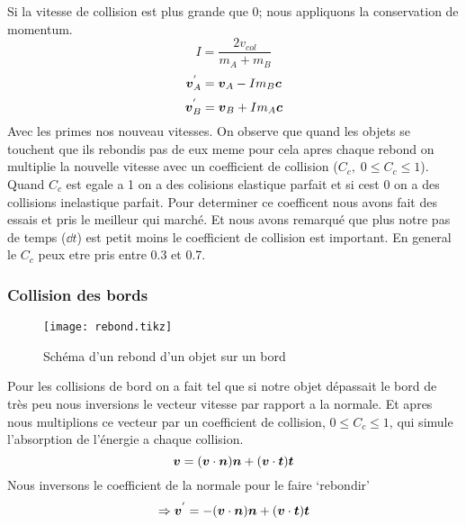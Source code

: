             Si la vitesse de collision est plus grande que 0; nous appliquons la conservation de momentum.
            \begin{equation}
                I = \frac{2v_{col}}{m_A + m_B}
            \end{equation}
            \begin{equation}
                \vb*{v}_A^{'} = \vb*{v}_A - Im_B\vb*{c}
            \end{equation}
            \begin{equation}
                \vb*{v}_B^{'} = \vb*{v}_B + Im_A\vb*{c}
            \end{equation}
            Avec les primes nos nouveau vitesses. On observe que quand les objets se touchent que ils rebondis pas de eux meme pour cela apres chaque rebond on multiplie la nouvelle vitesse avec un coefficient de collision ($C_{c} ,\;0 \leq C_{c} \leq  1$). Quand $C_{c}$ est egale a 1 on a des colisions elastique parfait et si cest 0 on a des collisions inelastique parfait. Pour determiner ce coefficent nous avons fait des essais et pris le meilleur qui marché. Et nous avons remarqué que plus notre pas de temps ($\dd t$) est petit moins le coefficient de collision est important. En general le $C_c$ peux etre pris entre 0.3 et  0.7.
            

        \subsubsection{Collision des bords}
            \begin{wrapfigure}{r}{0.25\textwidth}
                \centering
                \texttt{[image: rebond.tikz]}
                \caption{Schéma d'un rebond d'un objet sur un bord}
            \end{wrapfigure}
            Pour les collisions de bord on a fait tel que si notre objet dépassait le bord de très peu nous inversions le vecteur vitesse par rapport a la normale. Et apres nous multiplions ce vecteur par un coefficient de collision, $0 \leq C_c \leq 1$, qui simule l’absorption de l'énergie a chaque collision. 
            \begin{equation}
                \vb*{v} = (\vb*{v}\cdot\vb*{n})\vb*{n} +(\vb*{v}\cdot\vb*{t})\vb*{t}
            \end{equation}
            Nous inversons le coefficient de la normale pour le faire `rebondir'
            \begin{equation}
                \Rightarrow\vb*{v}^{'} = -(\vb*{v}\cdot\vb*{n})\vb*{n} + (\vb*{v}\cdot\vb*{t})\vb*{t}
            \end{equation}
